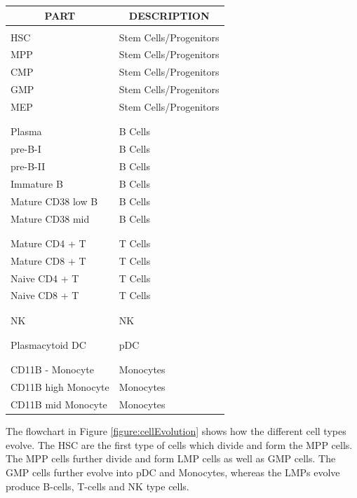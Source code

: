 \documentclass{article} %
\begin{document}
\begin{center}
\label{table:CellNamesAndTypes}
\begin{tabular}{ll}
\multicolumn{1}{c}{\bf PART}  &\multicolumn{1}{c}{\bf DESCRIPTION}
\\ \hline \\
HSC         &Stem Cells/Progenitors \\
MPP             &Stem Cells/Progenitors \\
CMP             &Stem Cells/Progenitors \\
GMP		&Stem Cells/Progenitors\\
MEP 	&Stem Cells/Progenitors\\
\\ \hline \\
Plasma	&B Cells\\
pre-B-I	&B Cells\\
pre-B-II	&B Cells\\
Immature B &B Cells\\
Mature CD38 low B	&B Cells\\
Mature CD38 mid	&B Cells\\
\\ \hline \\ 
Mature CD4 + T	&T Cells\\
Mature CD8 + T	&T Cells\\
Naive CD4 + T		&T Cells\\
Naive CD8 + T		&T Cells\\
\\ \hline \\
NK	&NK\\
\\ \hline \\
Plasmacytoid DC	&pDC \\
\\ \hline \\
CD11B - Monocyte	& Monocytes\\
CD11B high Monocyte	&Monocytes\\
CD11B mid Monocyte 	&Monocytes\\
\end{tabular}
\end{center}


The flowchart in Figure \ref{figure:cellEvolution} shows how the different cell types evolve. The HSC are the first type of cells which divide and form the MPP cells. The MPP cells further divide and form LMP cells as well as GMP cells. The GMP cells further evolve into pDC and Monocytes, whereas the LMPs evolve produce B-cells, T-cells and NK type cells.  
\end{document}
